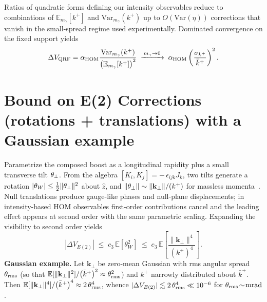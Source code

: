 \documentclass[aps,11pt]{article}
\newcommand{\Var}{\mathrm{Var}}
\newcommand{\E}{\mathbb{E}}
\newcommand{\kplus}{k^{+}}
\newcommand{\kperp}{\mathbf{k}_{\perp}}
\newcommand{\kbar}{\bar{k}^{+}}
\newcommand{\alphahom}{\alpha_{\text{HOM}}}
\begin{document}
Ratios of quadratic forms defining our intensity observables reduce to combinations of \(\E_{m_\gamma}[\kplus]\) and \(\Var_{m_\gamma}(\kplus)\) up to \(O(\Var(\eta))\) corrections that vanish in the small-spread regime used experimentally. Dominated convergence on the fixed support yields
\begin{equation}
\Delta V_{\rm QRF}= \alphahom \frac{\Var_{m_\gamma}(\kplus)}{\big(\E_{m_\gamma}[\kplus]\big)^{2}}
\;\xrightarrow[]{\,m_\gamma\to 0\,}\;
\alphahom \left(\frac{\sigma_{\kplus}}{\kbar}\right)^{2}.
\end{equation}

\section{Bound on E(2) Corrections (rotations + translations) with a Gaussian example}\label{app:E2bound}
Parametrize the composed boost as a longitudinal rapidity plus a small transverse tilt \(\vb{\theta}_\perp\). From the algebra \([K_i,K_j]=-\,\epsilon_{ijk}J_k\), two tilts generate a rotation \(|\theta_W|\le \tfrac12\|\vb{\theta}_\perp\|^2\) about \(\hat z\), and \(\|\vb{\theta}_\perp\|\sim \|\kperp\|/(\kplus)\) for massless momenta~\cite{Wigner1939,Weinberg1995}. Null translations produce gauge-like phases and null-plane displacements; in intensity-based HOM observables first-order contributions cancel and the leading effect appears at second order with the same parametric scaling. Expanding the visibility to second order yields
\begin{equation}
|\Delta V_{E(2)}|\;\le\; c_3 \,\E[\theta_W^{2}] \;\le\; c_3 \,\E\!\left[\frac{\|\kperp\|^{4}}{(\kplus)^{4}}\right].
\end{equation}
\textbf{Gaussian example.} Let \(\kperp\) be zero-mean Gaussian with rms angular spread \(\theta_{\rm rms}\) (so that \(\E[\|\kperp\|^{2}]/\big(\kbar\big)^{2}\approx \theta_{\rm rms}^{2}\)) and \(\kplus\) narrowly distributed about \(\kbar\). Then
\(
\E[\|\kperp\|^{4}]/\big(\kbar\big)^{4}\approx 2\,\theta_{\rm rms}^{4}
\),
whence \(|\Delta V_{E(2)}|\lesssim 2\,\theta_{\rm rms}^{4}\ll 10^{-6}\) for \(\theta_{\rm rms}\!\sim\!\mathrm{mrad}\).
\end{document}
